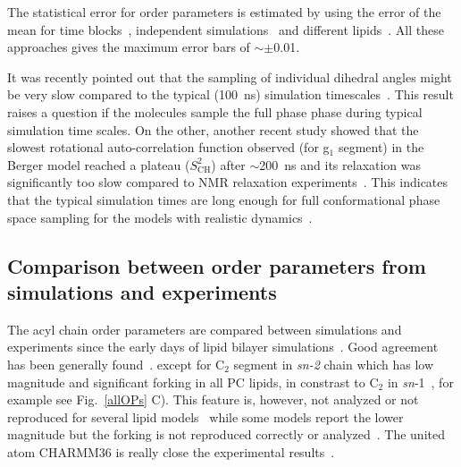 \documentclass[aps,prl,superscriptaddress,twocolumn]{revtex4}
\begin{document}
The statistical error for order parameters is estimated by using the error of the mean for time blocks~\cite{ollila07a},  
independent simulations~\cite{poger12} and different lipids~\cite{botan15}. All these approaches gives the maximum error 
bars of $\sim \pm$0.01.

It was recently pointed out that the sampling of individual dihedral angles might be very
slow compared to the typical (100~ns) simulation timescales~\cite{vogel12}.
This result raises a question if the molecules sample the full phase phase
during typical simulation time scales. On the other, another recent study showed
that the slowest rotational auto-correlation function observed (for g$_1$ segment) 
in the Berger model reached a plateau ($S_\mathrm{CH}^2$) after $\sim$200~ns
and its relaxation was significantly too slow compared to NMR relaxation experiments~\cite{ferreira15}. 
This indicates that the typical simulation times are long enough for full conformational 
phase space sampling for the models with realistic dynamics~\cite{ferreira15}.



\subsection{Comparison between order parameters from simulations and experiments}

The acyl chain order parameters are compared between simulations and experiments since the early days of lipid bilayer 
simulations~\cite{ploeg82,egberts88,stouch93,egberts94,essex94,robinson94,hyvonen95,kothekar96,tieleman96,shinoda97,berger97,tieleman97,klauda08b}. 
Good agreement has been generally found~\cite{berger97,hogberg08,poger10,ulmschneider09,kukol09,chiu09,klauda10,dickson12,jambeck12,chowdhary13,maciejewski14,tjornhammar14,dickson14,lee14}.
except for C$_2$ segment in {\it sn-2} chain which has low magnitude and significant forking in all PC lipids, in constrast to C$_2$ in 
{\it sn}-1~\cite{seelig74,seelig75,gross97,dvinskikh05a,ferreira13}, for example see Fig.~\ref{allOPs} C). 
This feature is, however, not analyzed or not reproduced for several lipid models~\cite{hogberg08,siu08,chiu09,kukol09,ulmschneider09,jambeck12,dickson12,chowdhary13,tjornhammar14,maciejewski14}
while some models report the lower magnitude but the forking is not reproduced correctly or analyzed~\cite{siu08,klauda10,chowdhary13,dickson14}.
The united atom CHARMM36 is really close the experimental results~\cite{lee14}.
\end{document}
